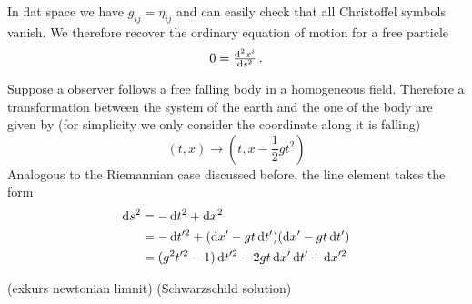 In flat space we have $g_{ij}=\eta_{ij}$ and can easily check that all
Christoffel symbols vanish. We therefore recover the ordinary equation of motion for a free particle
\begin{equation}
    0 = \od[2]{x^i}{s}\, .
\end{equation}
\begin{example}
Suppose a observer follows a free falling body in a homogeneous field. 
Therefore a transformation between the system of the earth and the one of the body are given by 
(for simplicity we only consider the coordinate along it is falling)
\begin{equation}
    (t,x)\to\left(t,x-\frac{1}{2}gt^2\right)
\end{equation}
Analogous to the Riemannian case discussed before, the line element takes the form
\begin{align*}
    \dif s^2&=-\dif t^2 +\dif x^2\\
    &=-\dif t'^2+(\dif x'- gt\dif t')(\dif x'- gt\dif t')\\
    &=(g^2t'^2-1)\dif t'^2-2gt\dif x'\dif t'+\dif x'^2\\
\end{align*}
\end{example}
(exkurs newtonian limnit)
(Schwarzschild solution)